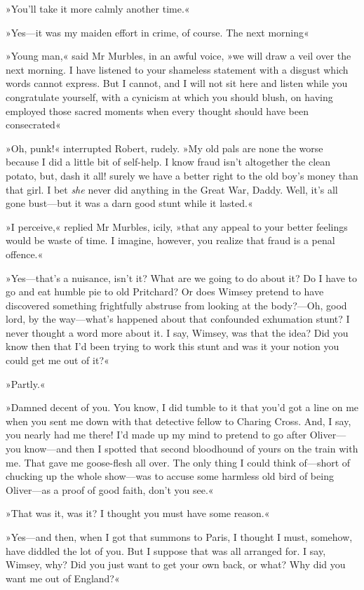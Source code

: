 »You'll take it more calmly another time.«

»Yes—it was my maiden effort in crime, of course. The next morning\longdash«

»Young man,« said Mr Murbles, in an awful voice, »we will draw a veil over the next morning. I have listened to your shameless statement with a disgust which words cannot express. But I cannot, and I will not sit here and listen while you congratulate yourself, with a cynicism at which you should blush, on having employed those sacred moments when every thought should have been consecrated\longdash«

»Oh, punk!« interrupted Robert, rudely. »My old pals are none the worse because I did a little bit of self-help. I know fraud isn't altogether the clean potato, but, dash it all! surely we have a better right to the old boy's money than that girl. I bet \textit{she} never did anything in the Great War, Daddy. Well, it's all gone bust—but it was a darn good stunt while it lasted.«

»I perceive,« replied Mr Murbles, icily, »that any appeal to your better feelings would be waste of time. I imagine, however, you realize that fraud is a penal offence.«

»Yes—that's a nuisance, isn't it? What are we going to do about it? Do I have to go and eat humble pie to old Pritchard? Or does Wimsey pretend to have discovered something frightfully abstruse from looking at the body?—Oh, good lord, by the way—what's happened about that confounded exhumation stunt? I never thought a word more about it. I say, Wimsey, was that the idea? Did you know then that I'd been trying to work this stunt and was it your notion you could get me out of it?«

»Partly.«

»Damned decent of you. You know, I did tumble to it that you'd got a line on me when you sent me down with that detective fellow to Charing Cross. And, I say, you nearly had me there! I'd made up my mind to pretend to go after Oliver—you know—and then I spotted that second bloodhound of yours on the train with me. That gave me goose-flesh all over. The only thing I could think of—short of chucking up the whole show—was to accuse some harmless old bird of being Oliver—as a proof of good faith, don't you see.«

»That was it, was it? I thought you must have some reason.«

»Yes—and then, when I got that summons to Paris, I thought I must, somehow, have diddled the lot of you. But I suppose that was all arranged for. I say, Wimsey, why? Did you just want to get your own back, or what? Why did you want me out of England?«

